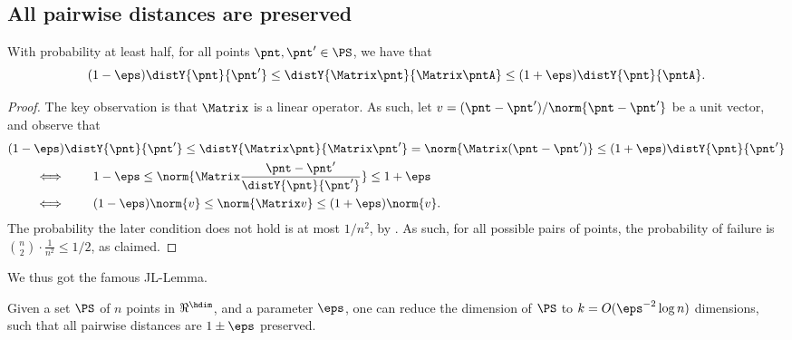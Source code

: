 \subsection{All pairwise distances are preserved}

\begin{lemma}
    With probability at least half, for all points $\pnt, \pnt' \in
    \PS$, we have that
    \begin{equation*}
        (1-\eps) \distY{\pnt}{\pnt'}%
        \leq%
        \distY{ \Matrix \pnt}{\Matrix \pntA }%
        \leq%
        (1+\eps) \distY{\pnt}{\pntA}.%
    \end{equation*}
\end{lemma}
\begin{proof}
    The key observation is that $\Matrix$ is a linear operator. As
    such, let $v = (\pnt - \pnt') / \norm{\pnt - \pnt'}$ be a unit
    vector, and observe that
    \begin{align*}
      &(1-\eps) \distY{\pnt}{\pnt'}%
        \leq%
        \distY{ \Matrix \pnt}{\Matrix \pnt' }%
        =%
        \norm{ \Matrix( \pnt- \pnt') }%
        \leq%
        (1+\eps) \distY{\pnt}{\pnt'}
      \\&%
      \qquad \iff \qquad%
      1-\eps %
      \leq%
        \norm{ \Matrix\frac{ \pnt- \pnt'}{\distY{\pnt}{\pnt'}} }%
        \leq%
      1+\eps
      \\&%
      \qquad \iff \qquad%
      (1-\eps) \norm{v}%
      \leq%
      \norm{ \Matrix v  }%
      \leq%
      (1+\eps) \norm{v}.        
    \end{align*}
    The probability the later condition does not hold is at most
    $1/n^2$, by . As such, for all possible pairs
    of points, the probability of failure is
    $\binom{n}{2} \cdot \frac{1}{n^2} \leq 1/2$, as claimed.
\end{proof}

We thus got the famous J{}L-Lemma.

\begin{theorem}
    Given a set $\PS$ of $n$ points in $\Re^\hdim$, and a parameter
    $\eps$, one can reduce the dimension of $\PS$ to
    $k = O(\eps^{-2} \log n)$ dimensions, such that all pairwise
    distances are $1\pm \eps$ preserved.
\end{theorem}


